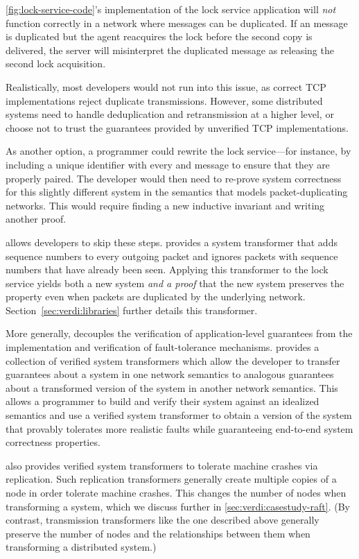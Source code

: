  \cref{fig:lock-service-code}'s
implementation of the lock service application will \emph{not} function
correctly in a network where messages can be duplicated.
%
If an \UnlockMsg message is duplicated but the agent reacquires the lock
before the second copy is delivered, the server will misinterpret the
duplicated \UnlockMsg message as releasing the second lock acquisition.

Realistically, most developers would not run into this issue, as
correct TCP implementations reject duplicate transmissions. However,
some distributed systems need to handle deduplication and
retransmission at a higher level, or choose not to trust the
guarantees provided by unverified TCP implementations.

As another option, a programmer could rewrite the lock service---for
instance, by including a unique identifier with
every \GrantMsg and \UnlockMsg message to ensure that they are
properly paired.
%
The developer would then need to re-prove system correctness for this
slightly different system in the semantics that models packet-duplicating
networks.
%
This would require finding a new inductive invariant and writing another
proof.

%
\Verdi allows developers to skip these steps. \Verdi provides a system
transformer that adds sequence numbers to every outgoing packet and
ignores packets with sequence numbers that have already been seen.
%
Applying this transformer to the lock service yields both a new system
\textit{and a proof} that the new system preserves the 
property even when packets are duplicated by the underlying network.
%
Section~\ref{sec:verdi:libraries} further details this transformer.

More generally, \Verdi decouples the verification of application-level
guarantees from the implementation and verification of fault-tolerance
mechanisms.
%
\Verdi provides a collection of verified system transformers which allow
the developer to transfer guarantees about a system in one network
semantics to analogous guarantees about a transformed version of the
system in another network semantics.
%
This allows a programmer to build and verify their system against an
idealized semantics and use a verified system transformer to obtain a
version of the system that provably tolerates more realistic faults while
guaranteeing end-to-end system correctness properties.

\Verdi also provides verified system transformers to tolerate
machine crashes via replication.  Such replication transformers generally
create multiple copies of a node in order tolerate machine crashes.
%
This changes the number of nodes when transforming a system, which we
discuss further in \cref{sec:verdi:casestudy-raft}.
%
(By contrast, transmission transformers like the one described above
generally preserve the number of nodes and the relationships between them
when transforming a distributed system.)


